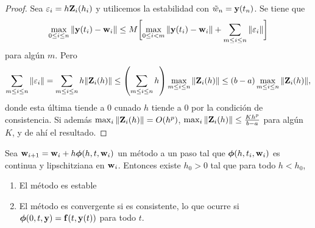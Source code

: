\begin{proof}
    Sea $\varepsilon_i = h\vb{Z}{}_i(h_i)$ y utilicemos la estabilidad
    con $\tilde{w}_n = \vb{y}{}(t_n)$. Se tiene que
    \begin{equation*}
        \max_{0 \le i \le n}\norm{\vb{y}{}(t_i) - \vb{w}{}_i} \le M\qty\bigg[
            \max_{0 \le i < m}\norm{\vb{y}{}(t_i) - \vb{w}{}_i}
            + \sum_{m\le i \le n}\norm{\varepsilon_i}
        ]
    \end{equation*}
    para algún $m$. Pero
    \begin{equation*}
        \sum_{m \le i \le n} \norm{\varepsilon_i} =
        \sum_{m \le i \le n} h\norm{\vb{Z}{}_i(h)} \le
        \qty(\sum_{m \le i \le n} h)
            \max_{m \le i \le n}\norm{\vb{Z}{}_i(h)} \le
        (b-a)\max_{m \le i \le n}\norm{\vb{Z}{}_i(h)},
    \end{equation*}
    donde esta última tiende a $0$ cunado $h$ tiende a $0$
    por la condición de consistencia.
    Si además $\max_i\norm{\vb{Z}{}_i(h)} = O(h^p)$,
    $\max_i\norm{\vb{Z}{}_i(h)} \le \frac{Kh^p}{b-a}$ para algún $K$,
    y de ahí el resultado.
\end{proof}

\begin{theorem}
    Sea $\vb{w}{}_{i+1} = \vb{w}{}_i + h\vb*{\phi}{}(h, t, \vb{w}{}_i)$ un método a un paso tal que
    $\vb*{\phi}{}(h, t_i, \vb{w}{}_i)$ es continua y lipschitziana en $\vb{w}{}_i$.
    Entonces existe $h_0 > 0$ tal que para todo $h < h_0$,
    \begin{enumerate}
        \item El método es estable
        \item El método es convergente si es consistente,
        lo que ocurre si $\vb*{\phi}{}(0, t, \vb{y}{}) = \vb{f}{}(t, \vb{y}{}(t))$ para todo $t$.
    \end{enumerate}
\end{theorem}

